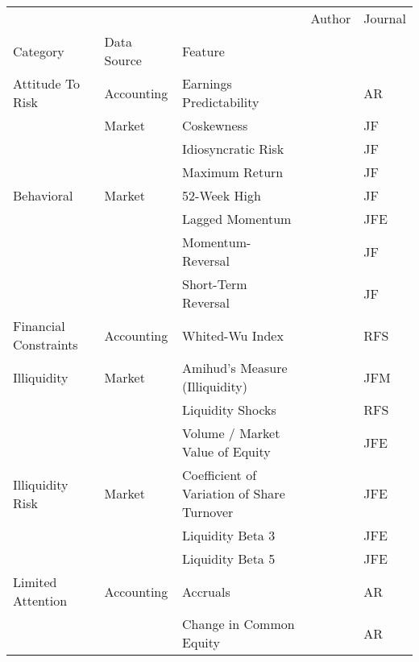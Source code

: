 \begin{tabular}{lllll}
\toprule
             &            &                                  &                             Author & Journal \\
Category & Data Source & Feature &                                    &         \\
\midrule
Attitude To Risk & Accounting & Earnings Predictability &            \cite{francis2004costs} &      AR \\
             & Market & Coskewness &       \cite{harvey2000conditional} &      JF \\
             &            & Idiosyncratic Risk &                \cite{ang2006cross} &      JF \\
             &            & Maximum Return &              \cite{bali2011maxing} &      JF \\
Behavioral & Market & 52-Week High &                \cite{george200452} &      JF \\
             &            & Lagged Momentum &            \cite{novy2012momentum} &     JFE \\
             &            & Momentum-Reversal &        \cite{jegadeesh1993returns} &      JF \\
             &            & Short-Term Reversal &       \cite{jegadeesh1990evidence} &      JF \\
Financial Constraints & Accounting & Whited-Wu Index &         \cite{whited2006financial} &     RFS \\
Illiquidity & Market & Amihud's Measure (Illiquidity) &       \cite{amihud2002illiquidity} &     JFM \\
             &            & Liquidity Shocks &           \cite{bali2013liquidity} &     RFS \\
             &            & Volume / Market Value of Equity &       \cite{haugen1996commonality} &     JFE \\
Illiquidity Risk & Market & Coefficient of Variation of Share Turnover &          \cite{chordia2001trading} &     JFE \\
             &            & Liquidity Beta 3 &            \cite{acharya2005asset} &     JFE \\
             &            & Liquidity Beta 5 &            \cite{acharya2005asset} &     JFE \\
Limited Attention & Accounting & Accruals &             \cite{sloan1996create} &      AR \\
             &            & Change in Common Equity &  \cite{richardson2006implications} &      AR \\

\end{tabular}
